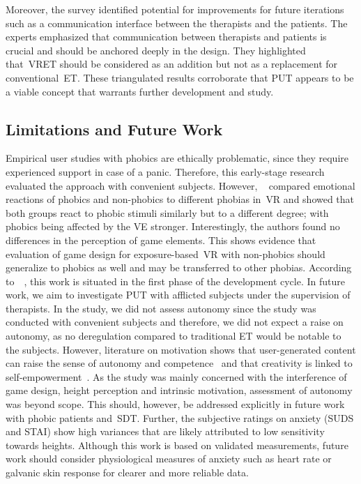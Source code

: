 Moreover, the survey identified potential for improvements for future iterations such as a communication interface between the therapists and the patients. The experts emphasized that communication between therapists and patients is crucial and should be anchored deeply in the design. They highlighted that~\ac{VRET} should be considered as an addition but not as a replacement for conventional~\ac{ET}.
These triangulated results corroborate that \ac{PUT} appears to be a viable concept that warrants further development and study.

\subsection{Limitations and Future Work}
Empirical user studies with phobics are ethically problematic, since they require experienced support in case of a panic. Therefore, this early-stage research evaluated the approach with convenient subjects. 
However, \citeauthor{robillard2003}~\cite{robillard2003} compared emotional reactions of phobics and non-phobics to different phobias in~\ac{VR} and showed that both groups react to phobic stimuli similarly but to a different degree; with phobics being affected by the \ac{VE} stronger. Interestingly, the authors found no differences in the perception of game elements. This shows evidence that evaluation of game design for exposure-based~\ac{VR} with non-phobics should generalize to phobics as well and may be transferred to other phobias. 
According to~\citeauthor{coyle2007}~\cite{coyle2007}, this work is situated in the first phase of the development cycle. In future work, we aim to investigate \ac{PUT} with afflicted subjects under the supervision of therapists.
In the study, we did not assess autonomy since the study was conducted with convenient subjects and therefore, we did not expect a raise on autonomy, as no deregulation compared to traditional \ac{ET} %
would be notable to the subjects.
However, literature on motivation shows that user-generated content can raise the sense of autonomy and competence~\cite{ryan2000,wang2014,zhang2008} and that creativity is linked to self-empowerment~\cite{sun2012}. As the study was mainly concerned with the interference of game design, height perception and intrinsic motivation, assessment of autonomy was beyond scope. This should, however, be addressed explicitly in future work with phobic patients and~\ac{SDT}. 
Further, the subjective ratings on anxiety (SUDS and STAI) show high variances that are likely attributed to low sensitivity towards heights. Although this work is based on validated measurements, future work should consider physiological measures of anxiety such as heart rate or galvanic skin response for clearer and more reliable data.

